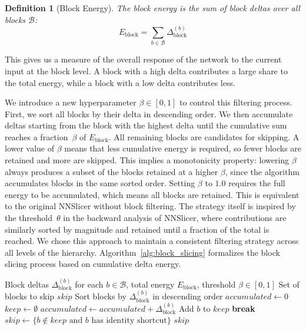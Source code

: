 \documentclass[
12pt,
fancyheadings,
a4paper,
twoside,
BCOR=0.7cm,
nobcorignoretitle,
grayscalebody,
]{stsreprt}
\newtheorem{definition}{Definition}[chapter]
\begin{document}
\begin{definition}[Block Energy]
The \textit{block energy} is the sum of block deltas over all blocks $\mathcal{B}$:
\begin{equation}
        E_{\text{block}} = \sum_{b \in \mathcal{B}} \Delta_{\text{block}}^{(b)}
\end{equation}
\end{definition}

This gives us a measure of the overall response of the network to the current input at the block
level.
A block with a high delta contributes a large share to the total energy, while a block with a low
delta contributes less.

We introduce a new hyperparameter $\beta \in [0, 1]$ to control this filtering process.
First, we sort all blocks by their delta in descending order.
We then accumulate deltas starting from the block with the highest delta until the cumulative sum
reaches a fraction~$\beta$ of $E_{\text{block}}$.
All remaining blocks are candidates for skipping.
A lower value of $\beta$ means that less cumulative energy is required, so fewer blocks are
retained and more are skipped.
This implies a monotonicity property: lowering $\beta$ always produces a subset of the blocks
retained at a higher $\beta$, since the algorithm accumulates blocks in the same sorted order.
Setting $\beta$ to $1.0$ requires the full energy to be accumulated, which means all blocks are
retained.
This is equivalent to the original NNSlicer without block filtering.
The strategy itself is inspired by the threshold~$\theta$ in the backward analysis of NNSlicer,
where contributions are similarly sorted by magnitude and retained until a fraction of the total is
reached.
We chose this approach to maintain a consistent filtering strategy across all levels of the
hierarchy.
Algorithm~\ref{alg:block_slicing} formalizes the block slicing process based on cumulative delta
energy.

\begin{algorithm}[ht]
\caption{BlockSlice: identifying residual blocks to skip}\label{alg:block_slicing}
\begin{algorithmic}[1]
\Require Block deltas $\Delta_{\text{block}}^{(b)}$ for each $b \in \mathcal{B}$, total energy $E_{\text{block}}$, threshold $\beta \in [0, 1]$
\Ensure Set of blocks to skip $\textit{skip}$
\State Sort blocks by $\Delta_{\text{block}}^{(b)}$ in descending order
\State $\textit{accumulated} \gets 0$
\State $\textit{keep} \gets \emptyset$
    \State $\textit{accumulated} \gets \textit{accumulated} + \Delta_{\text{block}}^{(b)}$
    \State Add $b$ to $\textit{keep}$
        \State \textbf{break}
    \EndIf
\EndFor
\State $\textit{skip} \gets \{b \notin \textit{keep} \text{ and } b \text{ has identity shortcut}\}$
\State \Return $\textit{skip}$
\end{algorithmic}
\end{algorithm}
\end{document}
